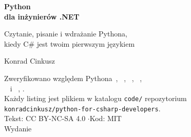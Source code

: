 \thispagestyle{empty}
\begin{center}
\vspace*{3.0cm}

{\Huge\bfseries\color{mblue} Python\\[6pt] dla inżynierów .NET}

\vspace{1.0cm}
{\Large\color{mgrey} Czytanie, pisanie i wdrażanie Pythona,\\[4pt]
kiedy C\# jest twoim pierwszym językiem}

\vspace{2.4cm}
{\large Konrad Cinkusz}

\vfill
{\small\color{mgrey}
Zweryfikowano względem Pythona~\pypatch, ~\uvver, ~\pydanticver,
~\fastapiver,\\ ~\sqlalchemyver{} i
~\pytestver, \pinnedon.\\[4pt]
Każdy listing jest plikiem w katalogu \texttt{code/} repozytorium
\texttt{konradcinkusz/python-for-csharp-developers}.\\[10pt]
Tekst: CC BY-NC-SA 4.0 \quad$\cdot$\quad Kod: MIT\\[4pt]
Wydanie \bookedition}

\vspace{1.2cm}
\end{center}
\clearpage
